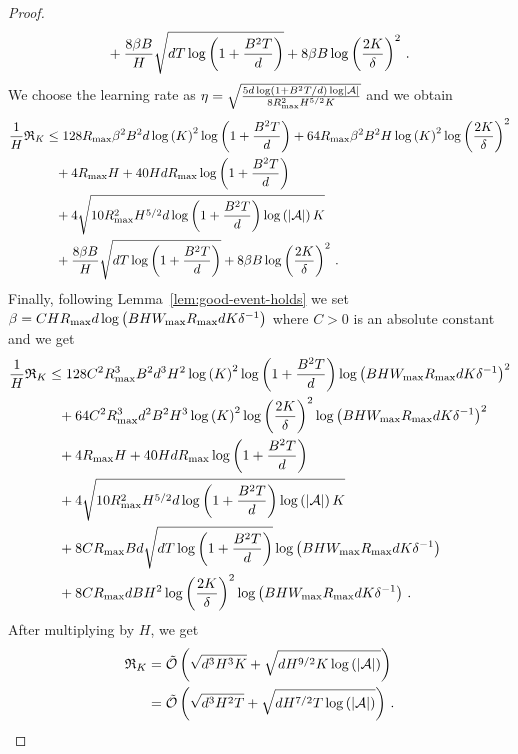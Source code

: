 \begin{proof}
\begin{align*}
        &\phantom{=}+ \frac{8 \beta B}{H} \sqrt{d T \log \left( 1 + \frac{B^2 T}{d} \right)} + 8 \beta B \log \left( \frac{2 K}{\delta} \right)^2\,.
    \end{align*}
    We choose the learning rate as $\eta = \sqrt{\frac{5 d \log \left( 1 + B^2 T / d \right) \log \left|\mathcal{A}\right|}{8 R_{\max}^2 H^{5 / 2} K}}$ and we obtain
    \begin{align*}
        \frac1H \mathfrak{R}_K &\leq 128 R_{\max} \beta^2 B^2 d \log \left( K \right)^2 \log \left( 1 + \frac{B^2 T}{d} \right) + 64 R_{\max} \beta^2 B^2 H \log \left( K \right)^2 \log \left( \frac{2 K}{\delta} \right)^2 \\
        &\phantom{=}+ 4 R_{\max} H + 40 H d R_{\max} \log \left( 1 + \frac{B^2 T}{d} \right) \\
        &\phantom{=}+ 4 \sqrt{10 R_{\max}^2 H^{5/2} d \log \left( 1 + \frac{B^2 T}{d} \right) \log \left( \left|\mathcal{A}\right| \right) K} \\
        &\phantom{=}+ \frac{8 \beta B}{H} \sqrt{d T \log \left( 1 + \frac{B^2 T}{d} \right)} + 8 \beta B \log \left( \frac{2 K}{\delta} \right)^2\,.
    \end{align*}
    Finally, following Lemma~\ref{lem:good-event-holds} we set $\beta = C H R_{\max} d \log \left( B H W_{\max} R_{\max} d K \delta^{-1} \right)$ where $C > 0$ is an absolute constant and we get
    \begin{align*}
        \frac1H \mathfrak{R}_K &\leq 128 C^2 R_{\max}^3 B^2 d^3 H^2 \log \left( K \right)^2 \log \left( 1 + \frac{B^2 T}{d} \right) \log \left( B H W_{\max} R_{\max} d K \delta^{-1} \right)^2 \\
        &\phantom{=}+ 64 C^2 R_{\max}^3 d^2 B^2 H^3 \log \left( K \right)^2 \log \left( \frac{2 K}{\delta} \right)^2 \log \left( B H W_{\max} R_{\max} d K \delta^{-1} \right)^2 \\
        &\phantom{=}+ 4 R_{\max} H + 40 H d R_{\max} \log \left( 1 + \frac{B^2 T}{d} \right) \\
        &\phantom{=}+ 4 \sqrt{10 R_{\max}^2 H^{5/2} d \log \left( 1 + \frac{B^2 T}{d} \right) \log \left( \left|\mathcal{A}\right| \right) K} \\
        &\phantom{=}+ 8 C R_{\max} B d \sqrt{d T \log \left( 1 + \frac{B^2 T}{d} \right)} \log \left( B H W_{\max} R_{\max} d K \delta^{-1} \right) \\
        &\phantom{=}+ 8 C R_{\max} d B H^2 \log \left( \frac{2 K}{\delta} \right)^2 \log \left( B H W_{\max} R_{\max} d K \delta^{-1} \right)\,.
    \end{align*}
    After multiplying by $H$, we get
    \begin{align*}
        \mathfrak{R}_K &= \tilde{\mathcal{O}} \left( \sqrt{d^3 H^3 K} + \sqrt{d H^{9/2} K \log \left( \left|\mathcal{A}\right| \right)} \right) \\
        &= \tilde{\mathcal{O}} \left( \sqrt{d^3 H^2 T} + \sqrt{d H^{7/2} T \log \left( \left|\mathcal{A}\right| \right)} \right)\,.
    \end{align*}
\end{proof}

